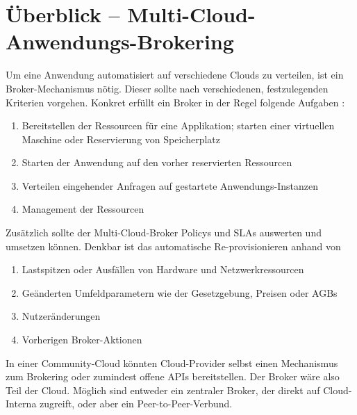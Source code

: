 \chapter{Überblick -- Multi-Cloud-Anwendungs-Brokering}
\label{cha:broker}


Um eine Anwendung automatisiert auf verschiedene Clouds zu verteilen, ist ein Broker-Mechanismus nötig. Dieser sollte nach verschiedenen, festzulegenden Kriterien vorgehen. Konkret erfüllt ein Broker in der Regel folgende Aufgaben \cite{gartner:2017:cloud-market-multicloud-trend}:

\begin{enumerate}
	\item Bereitstellen der Ressourcen für eine Applikation; starten einer virtuellen Maschine oder Reservierung von Speicherplatz
	\item Starten der Anwendung auf den vorher reservierten Ressourcen
	\item Verteilen eingehender Anfragen auf gestartete Anwendungs-Instanzen
	\item Management der Ressourcen
\end{enumerate}

\noindent
Zusätzlich sollte der Multi-Cloud-Broker Policys und SLAs auswerten und umsetzen können. Denkbar ist das automatische Re-provisionieren anhand von 

\begin{enumerate}
	\item Lastspitzen oder Ausfällen von Hardware und Netzwerkressourcen 
	\item Geänderten Umfeldparametern wie der Gesetzgebung, Preisen oder AGBs
	\item Nutzeränderungen
	\item Vorherigen Broker-Aktionen
\end{enumerate}

\noindent
In einer Community-Cloud könnten Cloud-Provider selbst einen Mechanismus zum Brokering oder zumindest offene APIs bereitstellen. Der Broker wäre also Teil der Cloud. Möglich sind entweder ein zentraler Broker, der direkt auf Cloud-Interna zugreift, oder aber ein Peer-to-Peer-Verbund.

